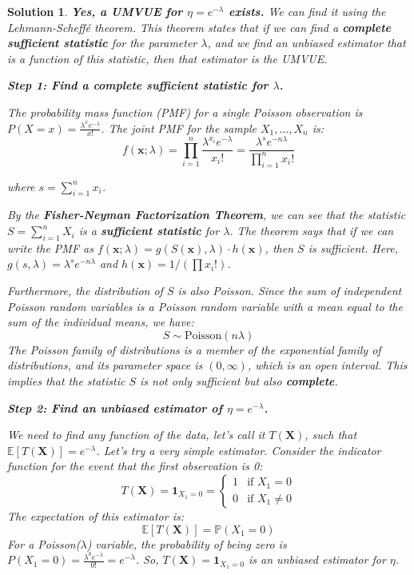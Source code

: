 \documentclass[12pt]{amsart}
\newtheorem*{solution}{Solution}
\begin{document}
\begin{solution}
\textbf{Yes, a UMVUE for $\eta = e^{-\lambda}$ exists.} We can find it using the Lehmann-Scheffé theorem. This theorem states that if we can find a \textbf{complete sufficient statistic} for the parameter $\lambda$, and we find an unbiased estimator that is a function of this statistic, then that estimator is the UMVUE.

\textbf{Step 1: Find a complete sufficient statistic for $\lambda$.}

The probability mass function (PMF) for a single Poisson observation is $P(X=x) = \frac{\lambda^x e^{-\lambda}}{x!}$. The joint PMF for the sample $X_1, \ldots, X_n$ is:
$$f(\mathbf{x}; \lambda) = \prod_{i=1}^n \frac{\lambda^{x_i} e^{-\lambda}}{x_i!} = \frac{\lambda^s e^{-n\lambda}}{\prod_{i=1}^n x_i!}$$

where $s = \sum_{i=1}^n x_i$.

By the \textbf{Fisher-Neyman Factorization Theorem}, we can see that the statistic $S = \sum_{i=1}^n X_i$ is a \textbf{sufficient statistic} for $\lambda$. The theorem says that if we can write the PMF as $f(\mathbf{x}; \lambda) = g(S(\mathbf{x}), \lambda) \cdot h(\mathbf{x})$, then $S$ is sufficient. Here, $g(s, \lambda) = \lambda^s e^{-n\lambda}$ and $h(\mathbf{x}) = 1 / (\prod x_i!)$.

Furthermore, the distribution of $S$ is also Poisson. Since the sum of independent Poisson random variables is a Poisson random variable with a mean equal to the sum of the individual means, we have:
$$S \sim \text{Poisson}(n\lambda)$$
The Poisson family of distributions is a member of the exponential family of distributions, and its parameter space is $(0, \infty)$, which is an open interval. This implies that the statistic $S$ is not only sufficient but also \textbf{complete}.

\textbf{Step 2: Find an unbiased estimator of $\eta = e^{-\lambda}$.}

We need to find any function of the data, let's call it $T(\mathbf{X})$, such that $\mathbb{E}[T(\mathbf{X})] = e^{-\lambda}$. Let's try a very simple estimator. Consider the indicator function for the event that the first observation is 0:
$$T(\mathbf{X}) = \mathbf{1}_{X_1=0} = \begin{cases} 1 & \text{if } X_1=0 \\ 0 & \text{if } X_1 \neq 0 \end{cases}$$
The expectation of this estimator is:
$$\mathbb{E}[T(\mathbf{X})] = \mathbb{P}(X_1 = 0)$$
For a Poisson($\lambda$) variable, the probability of being zero is $P(X_1=0) = \frac{\lambda^0 e^{-\lambda}}{0!} = e^{-\lambda}$.
So, $T(\mathbf{X}) = \mathbf{1}_{X_1=0}$ is an unbiased estimator for $\eta$.


\end{solution}
\end{document}
